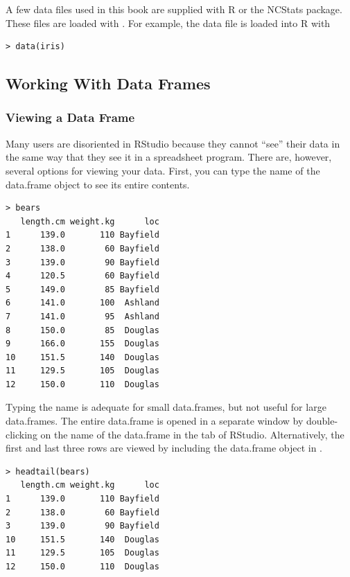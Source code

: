 \documentclass[10pt,openany]{book}\usepackage[]{graphicx}\usepackage[]{color}
\makeatletter
\newenvironment{kframe}{%
 \def\at@end@of@kframe{}%
 \ifinner\ifhmode%
  \def\at@end@of@kframe{\end{minipage}}%
  \begin{minipage}{\columnwidth}%
 \fi\fi%
 \def\FrameCommand##1{\hskip\@totalleftmargin \hskip-\fboxsep
 \colorbox{shadecolor}{##1}\hskip-\fboxsep
     \hskip-\linewidth \hskip-\@totalleftmargin \hskip\columnwidth}%
 \MakeFramed {\advance\hsize-\width
   \@totalleftmargin\z@ \linewidth\hsize
   \@setminipage}}%
 {\par\unskip\endMakeFramed%
 \at@end@of@kframe}
\newenvironment{knitrout}{}{} %
\makeatother
\begin{document}
A few data files used in this book are supplied with R or the NCStats package.  These files are loaded with .  For example, the  data file is loaded into R with
\begin{knitrout}
\color{fgcolor}\begin{kframe}
\begin{verbatim}
> data(iris)
\end{verbatim}
\end{kframe}
\end{knitrout}


\subsection{Working With Data Frames}  \label{sect:RWorkdf}
\vspace{-12pt}
\subsubsection{Viewing a Data Frame}  \label{sect:RViewdf}
\vspace{-12pt}
Many users are disoriented in RStudio because they cannot ``see'' their data in the same way that they see it in a spreadsheet program.  There are, however, several options for viewing your data.  First, you can type the name of the data.frame object to see its entire contents.
\begin{knitrout}
\color{fgcolor}\begin{kframe}
\begin{verbatim}
> bears
   length.cm weight.kg      loc
1      139.0       110 Bayfield
2      138.0        60 Bayfield
3      139.0        90 Bayfield
4      120.5        60 Bayfield
5      149.0        85 Bayfield
6      141.0       100  Ashland
7      141.0        95  Ashland
8      150.0        85  Douglas
9      166.0       155  Douglas
10     151.5       140  Douglas
11     129.5       105  Douglas
12     150.0       110  Douglas
\end{verbatim}
\end{kframe}
\end{knitrout}

Typing the name is adequate for small data.frames, but not useful for large data.frames.  The entire data.frame is opened in a separate window by double-clicking on the name of the data.frame in the  tab of RStudio.  Alternatively, the first and last three rows are viewed by including the data.frame object in .
\begin{knitrout}
\color{fgcolor}\begin{kframe}
\begin{verbatim}
> headtail(bears)
   length.cm weight.kg      loc
1      139.0       110 Bayfield
2      138.0        60 Bayfield
3      139.0        90 Bayfield
10     151.5       140  Douglas
11     129.5       105  Douglas
12     150.0       110  Douglas
\end{verbatim}
\end{kframe}
\end{knitrout}
\end{document}
